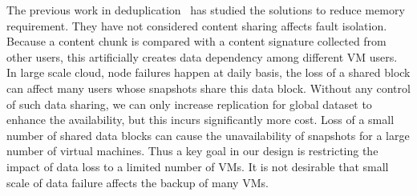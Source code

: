 \begin{itemize}
The previous work in deduplication~\cite{extreme_binning09,sparseindex09} has
studied the solutions  to reduce memory requirement.
They have not considered content sharing affects
fault isolation.
Because a content chunk is compared with a content signature collected from other users,
this artificially creates data dependency among different VM users.
In large scale cloud, node failures happen at daily basis,
the loss of a shared block can affect many users whose snapshots share this 
data block. 
Without any control of such data sharing, we can only increase  
replication for global dataset to enhance the availability,
but this incurs significantly more cost.
Loss of a small number of  shared data blocks can 
cause the unavailability of snapshots for a large number of virtual machines.
Thus a key goal  in our design
is restricting the impact of  data loss to a limited number of VMs. 
It is not desirable that small scale of data failure affects the backup of many VMs.

\end{itemize}

